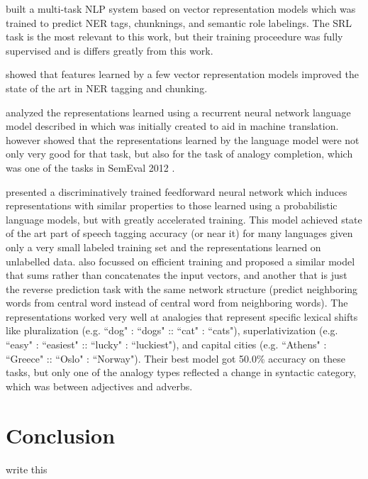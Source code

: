 \documentclass[11pt,letterpaper]{article}
\begin{document}

\cite{DBLP:conf/icml/CollobertW08} built a multi-task NLP system based
on vector representation models which was trained to predict NER tags,
chunknings, and semantic role labelings. The SRL task is the most relevant
to this work, but their training proceedure was fully supervised and
is differs greatly from this work.

\cite{turian} showed that features learned by
a few vector representation models improved the state of the art in NER tagging and chunking.


\cite{MikolovYZ13} analyzed the representations learned using
a recurrent neural network language model described in \cite{DBLP:conf/interspeech/KombrinkMKB11}
which was initially created to aid in machine translation.
\cite{MikolovYZ13} however showed that the representations learned by the
language model were not only very good for that task, but also for the
task of analogy completion, which was one of the tasks in SemEval 2012 \cite{semeval2012}.

\cite{rami} presented a discriminatively trained feedforward neural network
which induces representations with similar properties to those learned using
a probabilistic language models, but with greatly accelerated training.
This model achieved state of the art part of speech tagging accuracy (or near it)
for many languages given only a very small labeled training set and the representations
learned on unlabelled data.
\cite{DBLP:journals/corr/abs-1301-3781} also focussed on efficient training and
proposed a similar model that sums rather than concatenates the input vectors,
and another that is just the reverse prediction task with the same network structure
(predict neighboring words from central word instead of central word from neighboring words).
The representations worked very well at analogies that represent specific lexical shifts
like pluralization (e.g. ``dog" : ``dogs" :: ``cat" : ``cats"), superlativization
(e.g. ``easy" : ``easiest" :: ``lucky" : ``luckiest"), and
capital cities (e.g. ``Athens" : ``Greece" :: ``Oslo" : ``Norway").
Their best model got 50.0\% accuracy on these tasks, but only one of the analogy types
reflected a change in syntactic category, which was between adjectives and adverbs.


\section{Conclusion} %
write this



{}

\end{document}
